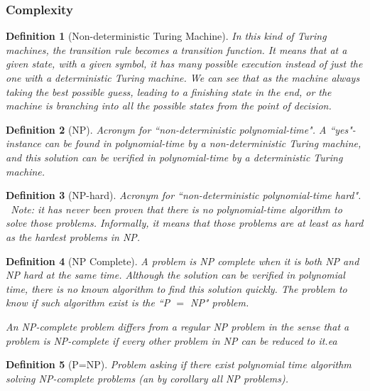 \documentclass[11pt,a4paper]{article}
\theoremstyle{customdef}
\newtheorem{definition}{Definition}
\begin{document}
\subsubsection{Complexity}

\begin{definition}[Non-deterministic Turing Machine]\label{def:nd-tm}
In this kind of Turing machines, the transition \emph{rule} becomes a transition \emph{function}.
It means that at a given state, with a given symbol, it has many possible execution instead of just the one with a deterministic Turing machine.
We can see that as the machine always taking the best possible guess, leading to a finishing state in the end, or the machine is branching into all the possible states from the point of decision.
\end{definition}

\begin{definition}[NP]\label{def:np}
Acronym for ``non-deterministic polynomial-time".
A ``yes"-instance can be found in polynomial-time by a non-deterministic Turing machine, and this solution can be verified in polynomial-time by a deterministic Turing machine.
\end{definition}

\begin{definition}[NP-hard]\label{def:np-hard}
Acronym for ``non-deterministic polynomial-time hard".
~\newline{}\noindent Note: it has never been proven that there is no polynomial-time algorithm to solve those problems.
Informally, it means that those problems are at least as hard as the hardest problems in NP.
\end{definition}

\begin{definition}[NP Complete]\label{def:np-comp}
A problem is NP complete when it is both NP and NP hard at the same time.
Although the solution can be verified in polynomial time, there is no known algorithm to find this solution quickly.
The problem to know if such algorithm exist is the ``P $=$ NP" problem.

An NP-complete problem differs from a regular NP problem in the sense that a problem is NP-complete if every other problem in NP can be reduced to it.ea
\end{definition}

\begin{definition}[P=NP]\label{def:p-np}
Problem asking if there exist polynomial time algorithm solving NP-complete problems (an by corollary all NP problems).
\end{definition}
\end{document}
